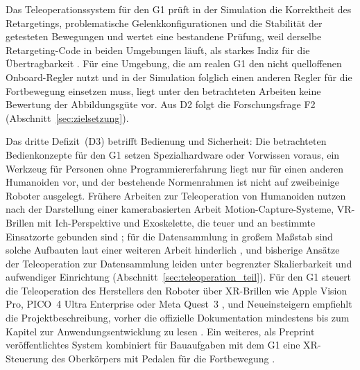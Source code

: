 Das Teleoperationssystem für den G1 prüft in der Simulation die Korrektheit des Retargetings, problematische Gelenkkonfigurationen und die Stabilität der getesteten Bewegungen \cite{Durrani2026} und wertet eine bestandene Prüfung, weil derselbe Retargeting-Code in beiden Umgebungen läuft, als starkes Indiz für die Übertragbarkeit \cite{Durrani2026}.
Für eine Umgebung, die am realen G1 den nicht quelloffenen Onboard-Regler nutzt und in der Simulation folglich einen anderen Regler für die Fortbewegung einsetzen muss, liegt unter den betrachteten Arbeiten keine Bewertung der Abbildungsgüte vor.
Aus D2 folgt die Forschungsfrage F2 (Abschnitt~\ref{sec:zielsetzung}).

Das dritte Defizit~(D3) betrifft Bedienung und Sicherheit: Die betrachteten Bedienkonzepte für den G1 setzen Spezialhardware oder Vorwissen voraus, ein Werkzeug für Personen ohne Programmiererfahrung liegt nur für einen anderen Humanoiden vor, und der bestehende Normenrahmen ist nicht auf zweibeinige Roboter ausgelegt.
Frühere Arbeiten zur Teleoperation von Humanoiden nutzen nach der Darstellung einer kamerabasierten Arbeit Motion-Capture-Systeme, VR-Brillen mit Ich-Perspektive und Exoskelette, die teuer und an bestimmte Einsatzorte gebunden sind \cite{Fu2024}; für die Datensammlung in großem Maßstab sind solche Aufbauten laut einer weiteren Arbeit hinderlich \cite{He2024}, und bisherige Ansätze der Teleoperation zur Datensammlung leiden unter begrenzter Skalierbarkeit und aufwendiger Einrichtung \cite{Zhao2025} (Abschnitt~\ref{sec:teleoperation_teil}).
Für den G1 steuert die Teleoperation des Herstellers den Roboter über XR-Brillen wie Apple Vision Pro, PICO~4 Ultra Enterprise oder Meta Quest~3 \cite{UnitreeXRTeleop}, und Neueinsteigern empfiehlt die Projektbeschreibung, vorher die offizielle Dokumentation mindestens bis zum Kapitel zur Anwendungsentwicklung zu lesen \cite{UnitreeXRTeleop}.
Ein weiteres, als Preprint veröffentlichtes System kombiniert für Bauaufgaben mit dem G1 eine XR-Steuerung des Oberkörpers mit Pedalen für die Fortbewegung \cite{AliPour2026}.

